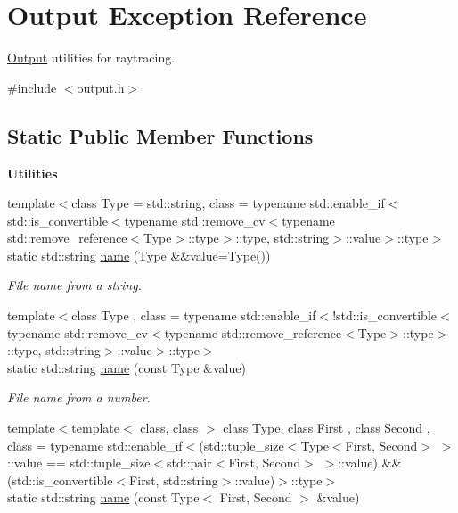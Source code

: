 \hypertarget{exceptionOutput}{\section{Output Exception Reference}
\label{exceptionOutput}
}


\hyperlink{exceptionOutput}{Output} utilities for raytracing.  




{\ttfamily \#include $<$output.\-h$>$}

\subsection*{Static Public Member Functions}
\begin{Indent}{\bf Utilities}\par
\begin{DoxyCompactItemize}
\item 
{\footnotesize template$<$class Type  = std\-::string, class  = typename std\-::enable\-\_\-if$<$std\-::is\-\_\-convertible$<$typename std\-::remove\-\_\-cv$<$typename std\-::remove\-\_\-reference$<$\-Type$>$\-::type$>$\-::type, std\-::string$>$\-::value$>$\-::type$>$ }\\static std\-::string \hyperlink{exceptionOutput_a7ccbf3e24a36a73f64cd117ba6b8b904}{name} (Type \&\&value=Type())
\begin{DoxyCompactList}\small\item\em File name from a string. \end{DoxyCompactList}\item 
{\footnotesize template$<$class Type , class  = typename std\-::enable\-\_\-if$<$!std\-::is\-\_\-convertible$<$typename std\-::remove\-\_\-cv$<$typename std\-::remove\-\_\-reference$<$\-Type$>$\-::type$>$\-::type, std\-::string$>$\-::value$>$\-::type$>$ }\\static std\-::string \hyperlink{exceptionOutput_a58f05b0b91d3739be64ba7c40577d5cb}{name} (const Type \&value)
\begin{DoxyCompactList}\small\item\em File name from a number. \end{DoxyCompactList}\item 
{\footnotesize template$<$template$<$ class, class $>$ class Type, class First , class Second , class  = typename std\-::enable\-\_\-if$<$(std\-::tuple\-\_\-size$<$\-Type$<$\-First, Second$>$ $>$\-::value == std\-::tuple\-\_\-size$<$std\-::pair$<$\-First, Second$>$ $>$\-::value) \&\& (std\-::is\-\_\-convertible$<$\-First, std\-::string$>$\-::value)$>$\-::type$>$ }\\static std\-::string \hyperlink{exceptionOutput_abe6f3af3439b365ae0edfec2ee8abfaf}{name} (const Type$<$ First, Second $>$ \&value)

\end{DoxyCompactItemize}
\end{Indent}
